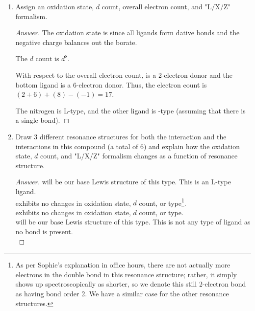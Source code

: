 \documentclass[../psets.tex]{subfiles}
\begin{document}
\begin{enumerate}
\begin{center}
    \end{center}
    \begin{enumerate}[label={\alph*)}]
        \item Assign an oxidation state, $d$ count, overall electron count, and "L/X/Z" formalism.
        \begin{proof}[Answer]
            The oxidation state is  since all ligands form dative bonds and the negative charge balances out the borate.\par
            The $d$ count is $d^8$.\par
            With respect to the overall electron count,  is a 2-electron donor and the bottom ligand is a 6-electron donor. Thus, the electron count is $(2+6)+(8)-(-1)=17$.\par
            The nitrogen is L-type, and the other ligand is -type (assuming that there is a single  bond).
        \end{proof}
        \item Draw 3 different resonance structures for both the  interaction and the  interactions in this compound (a total of 6) and explain how the oxidation state, $d$ count, and "L/X/Z" formalism changes as a function of resonance structure.
        \begin{proof}[Answer]
            \quad will be our base Lewis structure of this type. This is an L-type ligand.\\[9pt]
            \quad exhibits no changes in oxidation state, $d$ count, or type\footnote{\label{fnt:2electronMultipleBond}As per Sophie's explanation in office hours, there are not actually more electrons in the  double bond in this resonance structure; rather, it simply shows up spectroscopically as shorter, so we denote this still 2-electron bond as having bond order 2. We have a similar case for the other resonance structures.}.\\[9pt]
            \qquad exhibits no changes in oxidation state, $d$ count, or type.\\[15pt]
            \quad will be our base Lewis structure of this type. This is not any type of ligand as no bond is present.\\[9pt]

\end{proof}
\end{enumerate}
\end{enumerate}
\end{document}
